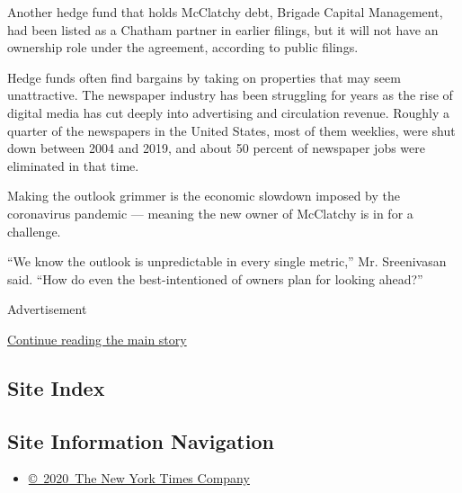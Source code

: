 Another hedge fund that holds McClatchy debt, Brigade Capital
Management, had been listed as a Chatham partner in earlier filings, but
it will not have an ownership role under the agreement, according to
public filings.

Hedge funds often find bargains by taking on properties that may seem
unattractive. The newspaper industry has been struggling for years as
the rise of digital media has cut deeply into advertising and
circulation revenue. Roughly a quarter of the newspapers in the United
States, most of them weeklies, were shut down between 2004 and 2019, and
about 50 percent of newspaper jobs were eliminated in that time.

Making the outlook grimmer is the economic slowdown imposed by the
coronavirus pandemic --- meaning the new owner of McClatchy is in for a
challenge.

``We know the outlook is unpredictable in every single metric,'' Mr.
Sreenivasan said. ``How do even the best-intentioned of owners plan for
looking ahead?''

Advertisement

\protect\hyperlink{after-bottom}{Continue reading the main story}

\hypertarget{site-index}{%
\subsection{Site Index}\label{site-index}}

\hypertarget{site-information-navigation}{%
\subsection{Site Information
Navigation}\label{site-information-navigation}}

\begin{itemize}
\tightlist
\item
  \href{https://help.nytimes3xbfgragh.onion/hc/en-us/articles/115014792127-Copyright-notice}{©~2020~The
  New York Times Company}
\end{itemize}

